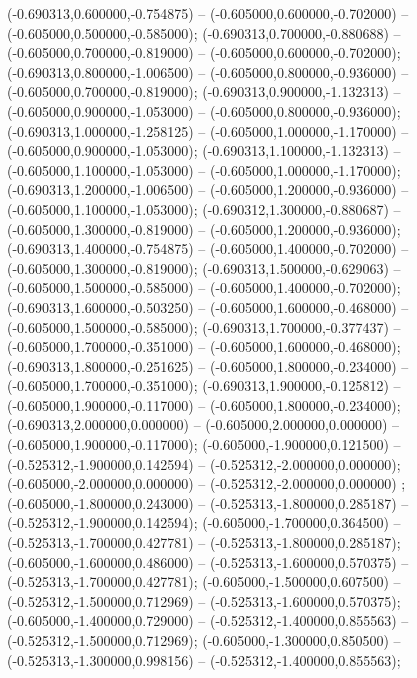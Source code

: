  (-0.690313,0.600000,-0.754875) -- (-0.605000,0.600000,-0.702000) -- (-0.605000,0.500000,-0.585000);
 (-0.690313,0.700000,-0.880688) -- (-0.605000,0.700000,-0.819000) -- (-0.605000,0.600000,-0.702000);
 (-0.690313,0.800000,-1.006500) -- (-0.605000,0.800000,-0.936000) -- (-0.605000,0.700000,-0.819000);
 (-0.690313,0.900000,-1.132313) -- (-0.605000,0.900000,-1.053000) -- (-0.605000,0.800000,-0.936000);
 (-0.690313,1.000000,-1.258125) -- (-0.605000,1.000000,-1.170000) -- (-0.605000,0.900000,-1.053000);
 (-0.690313,1.100000,-1.132313) -- (-0.605000,1.100000,-1.053000) -- (-0.605000,1.000000,-1.170000);
 (-0.690313,1.200000,-1.006500) -- (-0.605000,1.200000,-0.936000) -- (-0.605000,1.100000,-1.053000);
 (-0.690312,1.300000,-0.880687) -- (-0.605000,1.300000,-0.819000) -- (-0.605000,1.200000,-0.936000);
 (-0.690313,1.400000,-0.754875) -- (-0.605000,1.400000,-0.702000) -- (-0.605000,1.300000,-0.819000);
 (-0.690313,1.500000,-0.629063) -- (-0.605000,1.500000,-0.585000) -- (-0.605000,1.400000,-0.702000);
 (-0.690313,1.600000,-0.503250) -- (-0.605000,1.600000,-0.468000) -- (-0.605000,1.500000,-0.585000);
 (-0.690313,1.700000,-0.377437) -- (-0.605000,1.700000,-0.351000) -- (-0.605000,1.600000,-0.468000);
 (-0.690313,1.800000,-0.251625) -- (-0.605000,1.800000,-0.234000) -- (-0.605000,1.700000,-0.351000);
 (-0.690313,1.900000,-0.125812) -- (-0.605000,1.900000,-0.117000) -- (-0.605000,1.800000,-0.234000);
 (-0.690313,2.000000,0.000000) -- (-0.605000,2.000000,0.000000) -- (-0.605000,1.900000,-0.117000);
 (-0.605000,-1.900000,0.121500) -- (-0.525312,-1.900000,0.142594) -- (-0.525312,-2.000000,0.000000);
 (-0.605000,-2.000000,0.000000) -- (-0.525312,-2.000000,0.000000) ;
 (-0.605000,-1.800000,0.243000) -- (-0.525313,-1.800000,0.285187) -- (-0.525312,-1.900000,0.142594);
 (-0.605000,-1.700000,0.364500) -- (-0.525313,-1.700000,0.427781) -- (-0.525313,-1.800000,0.285187);
 (-0.605000,-1.600000,0.486000) -- (-0.525313,-1.600000,0.570375) -- (-0.525313,-1.700000,0.427781);
 (-0.605000,-1.500000,0.607500) -- (-0.525312,-1.500000,0.712969) -- (-0.525313,-1.600000,0.570375);
 (-0.605000,-1.400000,0.729000) -- (-0.525312,-1.400000,0.855563) -- (-0.525312,-1.500000,0.712969);
 (-0.605000,-1.300000,0.850500) -- (-0.525313,-1.300000,0.998156) -- (-0.525312,-1.400000,0.855563);

